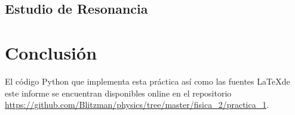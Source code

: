\documentclass[journal]{IEEEtran}
\begin{document}
\subsection{Estudio de Resonancia}
\label{subsec:estudioresonancia}

\section{Conclusión}
\label{sec:conclusion}

\clearpage

El código Python que implementa esta práctica así como las fuentes \LaTeX de este informe se encuentran disponibles online en el repositorio \url{https://github.com/Blitzman/physics/tree/master/fisica_2/practica_1}.
\end{document}
